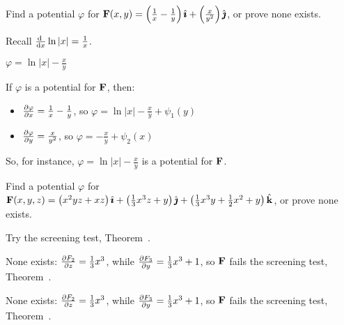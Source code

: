 \begin{question}
Find a potential $\varphi$ for $\mathbf{F}(x,y)=\left( \frac{1}{x}-\frac{1}{y}\right)\hat{\pmb{\imath}}+\left(\frac{x}{y^2}\right)\hat{\pmb{\jmath}}$, or prove none exists.
\end{question}
\begin{hint}
Recall $\diff{}{x} \ln |x| = \frac1x$.
\end{hint}
\begin{answer}
$\varphi=\ln |x| - \frac{x}{y}$
\end{answer}
\begin{solution}
If $\varphi$ is a potential for $\mathbf{F}$, then:
\begin{itemize}
\item $\pdiff{\varphi}{x}=\frac1x-\frac1y$, so $\varphi = \ln|x|-\frac{x}{y}+\psi_1(y)$
\item $\pdiff{\varphi}{y}=\frac{x}{y^2}$, so $\varphi = -\frac{x}{y}+\psi_2(x)$
\end{itemize}
So, for instance, $\varphi=\ln |x| - \frac{x}{y}$ is a potential for $\mathbf{F}$.

\end{solution}


\begin{question}
Find a potential $\varphi$ for $\mathbf{F}(x,y,z)=\left(x^2yz+xz\right)\hat{\pmb{\imath}}+\left( \frac13x^3z+y \right)\hat{\pmb{\jmath}}+\left(\frac13x^3y+\frac12x^2+y\right)\hat{\mathbf{k}}$, or prove none exists. %
\end{question}
\begin{hint}
Try the screening test, Theorem~.
\end{hint}
\begin{answer}
None exists: $\pdiff{F_2}{z}=\frac13x^3$, while $\pdiff{F_3}{y}=\frac{1}{3}x^3+1$, so $\mathbf{F}$ fails the screening test, Theorem~.
\end{answer}
\begin{solution}
None exists: $\pdiff{F_2}{z}=\frac13x^3$, while $\pdiff{F_3}{y}=\frac{1}{3}x^3+1$, so $\mathbf{F}$ fails the screening test, Theorem~.
\end{solution}

